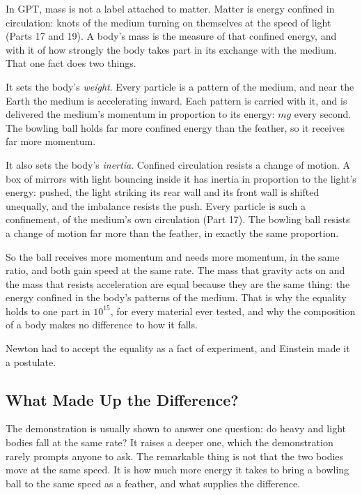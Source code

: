 \begin{hypbar}
In GPT, mass is not a label attached to matter. Matter is energy confined in circulation: knots of the medium turning on themselves at the speed of light (Parts 17 and 19).\footnotemark{} A body's mass is the measure of that confined energy, and with it of how strongly the body takes part in its exchange with the medium. That one fact does two things.

It sets the body's \emph{weight}. Every particle is a pattern of the medium, and near the Earth the medium is accelerating inward. Each pattern is carried with it, and is delivered the medium's momentum in proportion to its energy: $mg$ every second. The bowling ball holds far more confined energy than the feather, so it receives far more momentum.

It also sets the body's \emph{inertia}. Confined circulation resists a change of motion. A box of mirrors with light bouncing inside it has inertia in proportion to the light's energy: pushed, the light striking its rear wall and its front wall is shifted unequally, and the imbalance resists the push. Every particle is such a confinement, of the medium's own circulation (Part 17). The bowling ball resists a change of motion far more than the feather, in exactly the same proportion.

So the ball receives more momentum and needs more momentum, in the same ratio, and both gain speed at the same rate. The mass that gravity acts on and the mass that resists acceleration are equal because they are the same thing: the energy confined in the body's patterns of the medium. That is why the equality holds to one part in $10^{15}$, for every material ever tested, and why the composition of a body makes no difference to how it falls.
\end{hypbar}

Newton had to accept the equality as a fact of experiment, and Einstein made it a postulate. 

\subsection*{What Made Up the Difference?}

The demonstration is usually shown to answer one question: do heavy and light bodies fall at the same rate? It raises a deeper one, which the demonstration rarely prompts anyone to ask. The remarkable thing is not that the two bodies move at the same speed. It is how much more energy it takes to bring a bowling ball to the same speed as a feather, and what supplies the difference.

